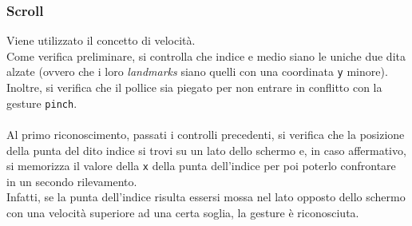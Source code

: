 \newpage
\subsubsection{Scroll}
Viene utilizzato il concetto di velocità.\\
Come verifica preliminare, si controlla che indice e medio siano le uniche due dita alzate (ovvero che i loro \textit{landmarks} siano quelli con una coordinata \texttt{y} minore). Inoltre, si verifica che il pollice sia piegato per non entrare in conflitto con la gesture \texttt{pinch}.\\
\\
\noindent Al primo riconoscimento, passati i controlli precedenti, si verifica che la posizione della punta del dito indice si trovi su un lato dello schermo e, in caso affermativo, si memorizza il valore della \texttt{x} della punta dell'indice per poi poterlo confrontare in un secondo rilevamento.\\
Infatti, se la punta dell'indice risulta essersi mossa nel lato opposto dello schermo con una velocità superiore ad una certa soglia, la gesture è riconosciuta.
